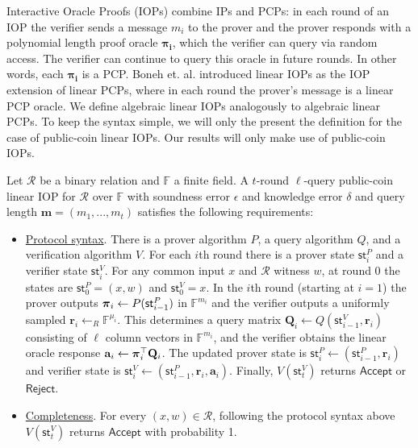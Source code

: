 Interactive Oracle Proofs (IOPs) \cite{BCS16, RRR16} combine IPs and PCPs: in each round of an IOP the verifier sends a message $m_i$ to the prover and the prover responds with a polynomial length proof oracle $\boldsymbol{\pi_i}$, which the verifier can query via random access. The verifier can continue to query this oracle in future rounds. In other words, each $\boldsymbol{\pi_i}$ is a PCP. Boneh et. al. \cite{IshaiCorrigan} introduced linear IOPs as the IOP extension of linear PCPs, where in each round the prover's message is a linear PCP oracle. We define algebraic linear IOPs analogously to algebraic linear PCPs. To keep the syntax simple, we will only the present the definition for the case of public-coin linear IOPs. Our results will only make use of public-coin IOPs. 

\begin{definition} 
\label{def:linearIOP}
Let $\mathcal{R}$ be a binary relation and $\mathbb{F}$ a finite field. A $t$-round $\ell$-query public-coin linear IOP for $\mathcal{R}$ over $\mathbb{F}$ with soundness error $\epsilon$ and knowledge error $\delta$ and query length $\mathbf{m} = (m_1,...,m_t)$ satisfies the following requirements: 

\begin{itemize} 
\item \underline{Protocol syntax}. There is a prover algorithm $P$, a query algorithm $Q$, and a verification algorithm $V$. For each $i$th round there is a prover state $\textsf{st}^P_i$ and a verifier state $\textsf{st}^V_i$. For any common input $x$ and $\mathcal{R}$ witness $w$, at round 0 the states are $\textsf{st}^P_0 = (x, w)$ and $\textsf{st}^V_0 = x$. 
In the $i$th round (starting at $i = 1$) the prover outputs $\boldsymbol{\pi}_i \leftarrow P(\textsf{st}^P_{i-1})$ in $\mathbb{F}^{m_i}$ and the verifier outputs a uniformly sampled $\mathbf{r}_i \leftarrow_R \mathbb{F}^{\mu_i}$. 
This determines a query matrix $\mathbf{Q}_i \leftarrow Q(\textsf{st}^V_{i-1}, \mathbf{r}_i)$ consisting of $\ell$ column vectors in $\mathbb{F}^{m_i}$, and the verifier obtains the linear oracle response $\mathbf{a}_i \leftarrow \boldsymbol{\pi}_i^\top \mathbf{Q}_i$. The updated prover state is $\textsf{st}^P_i \leftarrow (\textsf{st}^P_{i-1}, \mathbf{r}_i)$ and verifier state is $\textsf{st}^V_i \leftarrow (\textsf{st}^P_{i-1}, \mathbf{r}_i, \mathbf{a}_i)$. Finally, $V(\textsf{st}^V_t)$ returns $\textsf{Accept}$ or $\textsf{Reject}$.

\item \underline{Completeness}. For every $(x, w) \in \mathcal{R}$, following the protocol syntax above $V(\textsf{st}^V_t)$ returns $\textsf{Accept}$ with probability 1. 


\end{itemize}
\end{definition}
